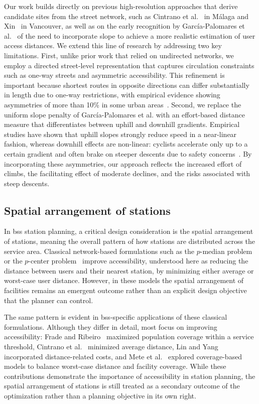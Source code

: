Our work builds directly on previous high-resolution approaches that derive candidate sites from the street network, such as Cintrano et al.~\cite{Cintrano2018} in Málaga and Xin~\cite{Xin2013} in Vancouver, as well as on the early recognition by García-Palomares et al.~\cite{GarciaPalomares2012} of the need to incorporate slope to achieve a more realistic estimation of user access distances. We extend this line of research by addressing two key limitations. First, unlike prior work that relied on undirected networks, we employ a directed street-level representation that captures circulation constraints such as one-way streets and asymmetric accessibility. This refinement is important because shortest routes in opposite directions can differ substantially in length due to one-way restrictions, with empirical evidence showing asymmetries of more than 10\% in some urban areas~\cite{Melo2022}. Second, we replace the uniform slope penalty of García-Palomares et al. with an effort-based distance measure that differentiates between uphill and downhill gradients. Empirical studies have shown that uphill slopes strongly reduce speed in a near-linear fashion, whereas downhill effects are non-linear: cyclists accelerate only up to a certain gradient and often brake on steeper descents due to safety concerns~\cite{Ryeng2016, Flugel2019}. By incorporating these asymmetries, our approach reflects the increased effort of climbs, the facilitating effect of moderate declines, and the risks associated with steep descents.


\subsection{Spatial arrangement of stations}

In \ac{bss} station planning, a critical design consideration is the spatial arrangement of stations, meaning the overall pattern of how stations are distributed across the service area. Classical network-based formulations such as the $p$-median problem or the $p$-center problem~\cite{Hakimi1964, Hakimi1965} improve accessibility, understood here as reducing the distance between users and their nearest station, by minimizing either average or worst-case user distance. However, in these models the spatial arrangement of facilities remains an emergent outcome rather than an explicit design objective that the planner can control.

The same pattern is evident in \ac{bss}-specific applications of these classical formulations. Although they differ in detail, most focus on improving accessibility: Frade and Ribeiro~\cite{Frade2015} maximized population coverage within a service threshold, Cintrano et al.~\cite{Cintrano2018} minimized average distance, Lin and Yang~\cite{Lin2011} incorporated distance-related costs, and Mete et al.~\cite{Mete2018} explored coverage-based models to balance worst-case distance and facility coverage. While these contributions demonstrate the importance of accessibility in station planning, the spatial arrangement of stations is still treated as a secondary outcome of the optimization rather than a planning objective in its own right.

